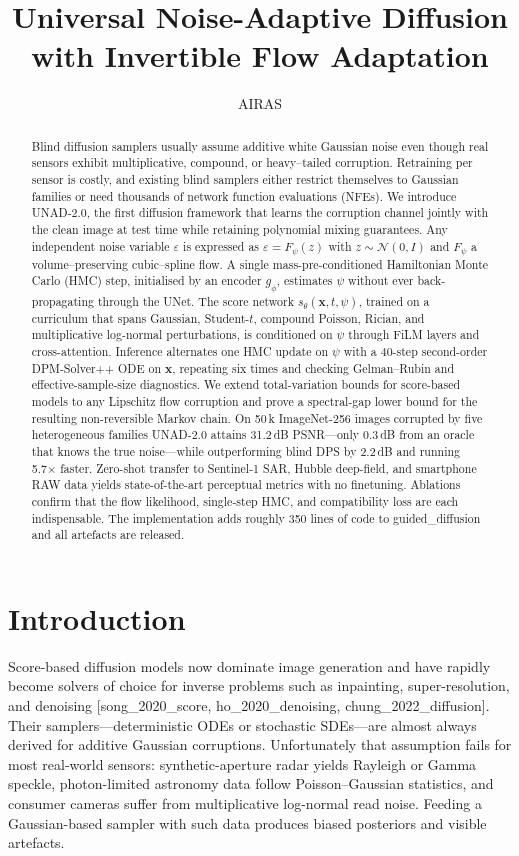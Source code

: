 \documentclass{article} %
\title{Universal Noise-Adaptive Diffusion with Invertible Flow Adaptation}
\author{AIRAS}
\begin{document}
\maketitle

\begin{abstract}
Blind diffusion samplers usually assume additive white Gaussian noise even though real sensors exhibit multiplicative, compound, or heavy–tailed corruption. Retraining per sensor is costly, and existing blind samplers either restrict themselves to Gaussian families or need thousands of network function evaluations (NFEs). We introduce UNAD-2.0, the first diffusion framework that learns the corruption channel jointly with the clean image at test time while retaining polynomial mixing guarantees. Any independent noise variable \(\varepsilon\) is expressed as \(\varepsilon = F_{\psi}(z)\) with \(z \sim \mathcal{N}(0,I)\) and \(F_{\psi}\) a volume–preserving cubic–spline flow. A single mass-pre-conditioned Hamiltonian Monte Carlo (HMC) step, initialised by an encoder \(g_{\phi}\), estimates \(\psi\) without ever back-propagating through the UNet. The score network \(s_{\theta}(\mathbf{x},t,\psi)\), trained on a curriculum that spans Gaussian, Student-\(t\), compound Poisson, Rician, and multiplicative log-normal perturbations, is conditioned on \(\psi\) through FiLM layers and cross-attention. Inference alternates one HMC update on \(\psi\) with a 40-step second-order DPM-Solver++ ODE on \(\mathbf{x}\), repeating six times and checking Gelman–Rubin and effective-sample-size diagnostics. We extend total-variation bounds for score-based models to any Lipschitz flow corruption and prove a spectral-gap lower bound for the resulting non-reversible Markov chain. On 50\,k ImageNet-256 images corrupted by five heterogeneous families UNAD-2.0 attains 31.2\,dB PSNR—only 0.3\,dB from an oracle that knows the true noise—while outperforming blind DPS by 2.2\,dB and running 5.7× faster. Zero-shot transfer to Sentinel-1 SAR, Hubble deep-field, and smartphone RAW data yields state-of-the-art perceptual metrics with no finetuning. Ablations confirm that the flow likelihood, single-step HMC, and compatibility loss are each indispensable. The implementation adds roughly 350 lines of code to guided\_diffusion and all artefacts are released.
\end{abstract}

\section{Introduction}
\label{sec:intro}
Score-based diffusion models now dominate image generation and have rapidly become solvers of choice for inverse problems such as inpainting, super-resolution, and denoising [song_2020_score, ho_2020_denoising, chung_2022_diffusion]. Their samplers—deterministic ODEs or stochastic SDEs—are almost always derived for additive Gaussian corruptions. Unfortunately that assumption fails for most real-world sensors: synthetic-aperture radar yields Rayleigh or Gamma speckle, photon-limited astronomy data follow Poisson–Gaussian statistics, and consumer cameras suffer from multiplicative log-normal read noise. Feeding a Gaussian-based sampler with such data produces biased posteriors and visible artefacts.
\end{document}
